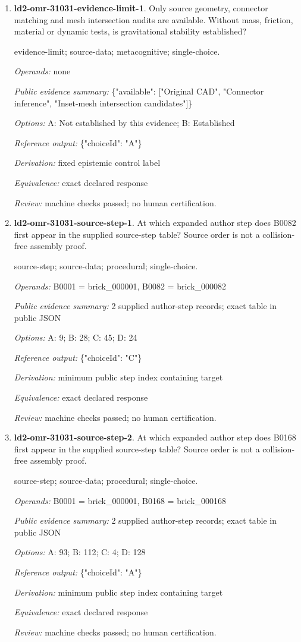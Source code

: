 \begin{enumerate}
\item \textbf{ld2-omr-31031-evidence-limit-1}. Only source geometry, connector matching and mesh intersection audits are available. Without mass, friction, material or dynamic tests, is gravitational stability established?
\par{\small evidence-limit; source-data; metacognitive; single-choice.\par\textit{Operands:} none\par\textit{Public evidence summary:} \{"available": ["Original CAD", "Connector inference", "Inset-mesh intersection candidates"]\}\par\textit{Options:} A: Not established by this evidence; B: Established\par\textit{Reference output:} \{"choiceId": "A"\}\par\textit{Derivation:} fixed epistemic control label\par\textit{Equivalence:} exact declared response\par\textit{Review:} machine checks passed; no human certification.}
\item \textbf{ld2-omr-31031-source-step-1}. At which expanded author step does B0082 first appear in the supplied source-step table? Source order is not a collision-free assembly proof.
\par{\small source-step; source-data; procedural; single-choice.\par\textit{Operands:} B0001 = brick\_000001, B0082 = brick\_000082\par\textit{Public evidence summary:} 2 supplied author-step records; exact table in public JSON\par\textit{Options:} A: 9; B: 28; C: 45; D: 24\par\textit{Reference output:} \{"choiceId": "C"\}\par\textit{Derivation:} minimum public step index containing target\par\textit{Equivalence:} exact declared response\par\textit{Review:} machine checks passed; no human certification.}
\item \textbf{ld2-omr-31031-source-step-2}. At which expanded author step does B0168 first appear in the supplied source-step table? Source order is not a collision-free assembly proof.
\par{\small source-step; source-data; procedural; single-choice.\par\textit{Operands:} B0001 = brick\_000001, B0168 = brick\_000168\par\textit{Public evidence summary:} 2 supplied author-step records; exact table in public JSON\par\textit{Options:} A: 93; B: 112; C: 4; D: 128\par\textit{Reference output:} \{"choiceId": "A"\}\par\textit{Derivation:} minimum public step index containing target\par\textit{Equivalence:} exact declared response\par\textit{Review:} machine checks passed; no human certification.}

\end{enumerate}
